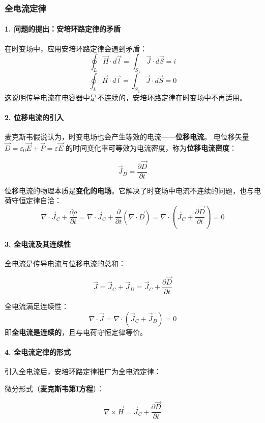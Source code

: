 \subsubsection{全电流定律}
\paragraph{1. 问题的提出：安培环路定律的矛盾}
在时变场中，应用安培环路定律会遇到矛盾：
\[
\oint_{L} \vec{H} \cdot d\vec{l} = \int_{S_1} \vec{J} \cdot d\vec{S} = i
\]
\[
\oint_{L} \vec{H} \cdot d\vec{l} = \int_{S_2} \vec{J} \cdot d\vec{S} = 0
\]
这说明传导电流在电容器中是不连续的，安培环路定律在时变场中不再适用。

\paragraph{2. 位移电流的引入}
麦克斯韦假说认为，时变电场也会产生等效的电流——\textbf{位移电流}。
电位移矢量 $\vec{D} = \varepsilon_0 \vec{E} + \vec{P} = \varepsilon \vec{E}$ 的时间变化率可等效为电流密度，称为\textbf{位移电流密度}：
\begin{formulaBox}
\[
\vec{J}_D = \frac{\partial \vec{D}}{\partial t}
\]
\end{formulaBox}

位移电流的物理本质是\textbf{变化的电场}。它解决了时变场中电流不连续的问题，也与电荷守恒定律自洽：
\[
\nabla \cdot \vec{J}_C + \frac{\partial \rho}{\partial t} = \nabla \cdot \vec{J}_C + \frac{\partial}{\partial t} (\nabla \cdot \vec{D}) = \nabla \cdot \left( \vec{J}_C + \frac{\partial \vec{D}}{\partial t} \right) = 0
\]

\paragraph{3. 全电流及其连续性}
全电流是传导电流与位移电流的总和：
\begin{formulaBox}
\[
\vec{J} = \vec{J}_C + \vec{J}_D = \vec{J}_C + \frac{\partial \vec{D}}{\partial t}
\]
\end{formulaBox}

全电流满足连续性：
\[
\nabla \cdot \vec{J} = \nabla \cdot (\vec{J}_C + \vec{J}_D) = 0
\]
即\textbf{全电流是连续的}，且与电荷守恒定律等价。

\paragraph{4. 全电流定律的形式}
引入全电流后，安培环路定律推广为全电流定律：

微分形式（\textbf{麦克斯韦第I方程}）：
\begin{formulaBox}
\[
\nabla \times \vec{H} = \vec{J}_C + \frac{\partial \vec{D}}{\partial t}
\]
\end{formulaBox}

